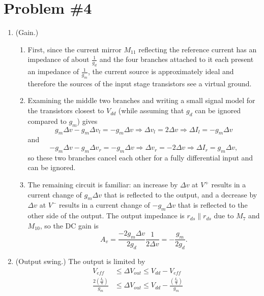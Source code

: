 \documentclass{article}
\begin{document}
\section*{Problem \#4}
\begin{enumerate}
  \item{(Gain.)
    \begin{enumerate}
      \item{First, since the current mirror $M_{11}$ reflecting the reference
        current has an impedance of about $\frac{1}{g_d}$ and the four branches
        attached to it each present an impedance of $\frac{1}{g_m}$, the current
        source is approximately ideal and therefore the sources of the input stage
        transistors see a virtual ground.
      } 
      \item{Examining the middle two branches and writing a small signal model for the 
        transistors closest to $V_{dd}$ (while assuming that $g_d$ can be ignored
        compared to $g_m$) gives
        $$
        g_m \Delta v - g_m \Delta v_l = -g_m \Delta v 
          \Rightarrow \Delta v_l = 2 \Delta v 
          \Rightarrow \Delta I_l = -g_m \Delta v
        $$
        and
        $$
        -g_m \Delta v - g_m \Delta v_r = -g_m \Delta v 
          \Rightarrow \Delta v_r = -2 \Delta v 
          \Rightarrow \Delta I_r = g_m \Delta v,
        $$
        so these two branches cancel each other for a fully differential input
        and can be ignored.
      }
      \item{The remaining circuit is familiar: an increase by $\Delta v$ at 
            $V^{+}$ results in a current change of $g_m \Delta v$ that is 
            reflected to the output, and a decrease by $\Delta v$ at $V^{-}$
            results in a current change of $-g_m \Delta v$ that is reflected
            to the other side of the output. The output impedance is 
            $r_{ds} \| r_{ds}$ due to $M_7$ and $M_{10}$, so the DC gain is
            $$A_v = \frac{-2 g_m \Delta v}{2 g_d} \frac{1}{2 \Delta v} = -\frac{g_m}{2 g_d}.$$
           }
  \end{enumerate}
  }
  \item{(Output swing.)
        The output is limited by
        \begin{align*}
        V_{eff} &\leq \Delta V_{out} \leq V_{dd} - V_{eff} \\
        \frac{2 \left(\frac{I_b}{4}\right)}{g_m} 
        & \leq \Delta V_{out} 
          \leq V_{dd} - \frac{ \left(\frac{I_b}{4}\right)}{g_m} \\

\end{align*}}
\end{enumerate}
\end{document}

